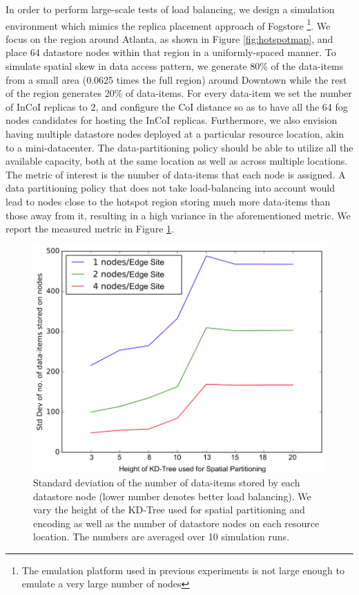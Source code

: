 \par In order to perform large-scale tests of load balancing, we design a simulation environment which mimics the replica placement approach of Fogstore \footnote{The emulation platform used in previous experiments is not large enough to emulate a very large number of nodes}. We focus on the region around Atlanta, as shown in Figure \ref{fig:hotspotmap}, and place 64 datastore nodes within that region in a uniformly-spaced manner. To simulate spatial skew in data access pattern, we generate 80\% of the data-items from a small area (0.0625 times the full region) around Downtown while the rest of the region generates 20\% of data-items. For every data-item we set the number of InCoI replicas to 2, and configure the CoI distance so as to have all the 64 fog nodes candidates for hosting the InCoI replicas. Furthermore, we also envision having multiple datastore nodes deployed at a particular resource location, akin to a mini-datacenter. The data-partitioning policy should be able to utilize all the available capacity, both at the same location as well as across multiple locations. The metric of interest is the number of data-items that each node is assigned. A data partitioning policy that does not take load-balancing into account would lead to nodes close to the hotspot region storing much more data-items than those away from it, resulting in a high variance in the aforementioned metric. We report the measured metric in Figure \ref{fig:loadbalancing}.
\begin{figure}[h]
\centering
\includegraphics[width=0.75\columnwidth]{figures/fogstore/evals/hotspot/stdDevs.png}
\caption{Standard deviation of the number of data-items stored by each datastore node (lower number denotes better load balancing). We vary the height of the KD-Tree used for spatial partitioning and encoding as well as the number of datastore nodes on each resource location. The numbers are averaged over 10 simulation runs.}
\label{fig:loadbalancing}
\end{figure}
